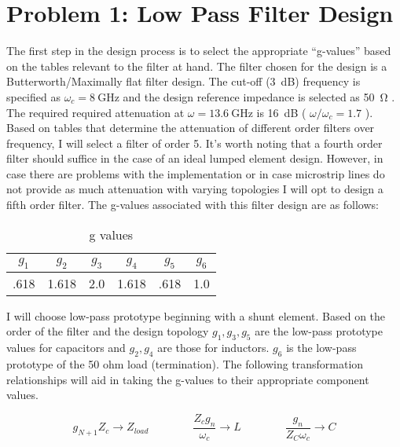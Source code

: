 \section*{Problem 1: Low Pass Filter Design}

The first step in the design process is to select the appropriate
``g-values'' based on the tables relevant to the filter at hand. The filter
chosen for the design is a Butterworth/Maximally flat filter design. The
cut-off (\SI{3}{\deci\bel}) frequency is specified as $ \omega_c =
\SI{8}{\giga\hertz}$ and the design reference impedance is selected as
\SI{50}{\ohm} . The required required attenuation at $ \omega =
\SI{13.6}{\giga\hertz}$ is \SI{16}{\deci\bel} ( $ \omega/\omega_c = 1.7 $ ).
Based on tables that determine the attenuation of different order filters
over frequency, I will select a filter of order 5. It's worth noting that a
fourth order filter should suffice in the case of an ideal lumped element
design. However, in case there are problems with the implementation or in
case microstrip lines do not provide as much attenuation with varying
topologies I will opt to design a fifth order filter. The g-values
associated with this filter design are as follows:

\begin{table}[h]
    \centering
    \caption{g values}
    \label{tab:1a_g_value_table}
    \begin{tabular}{|c|c|c|c|c|c|}
        \hline $g_{1}$ & $g_{2}$  & $ g_{3} $ & $ g_{4} $ & $ g_{5} $ & $
        g_{6} $ \\ 
        \hline .618    & 1.618    & 2.0       &  1.618    & .618 & 1.0 \\
        \hline
    \end{tabular}
\end{table}

I will choose low-pass prototype beginning with a shunt element. Based on
the order of the filter and the design topology $g_{1}, g_{3}, g_{5}$ are
the low-pass prototype values for capacitors and $g_{2}, g_{4}$ are those
for inductors. $g_{6}$ is the low-pass prototype of the 50 ohm load
(termination). The following transformation relationships will aid in taking
the g-values to their appropriate component values.

\begin{equation}
g_{N+1} Z_c \rightarrow Z_{load} \quad \quad \quad \quad
    \frac{Z_c g_n}{\omega_c} \rightarrow L \quad \quad \quad \quad
\frac{g_n}{Z_C \omega_c } \rightarrow C
    \end{equation}

